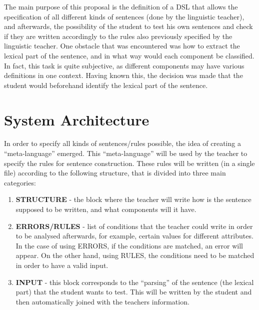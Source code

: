 The main purpose of this proposal is the definition of a \textsc{DSL} that allows the specification of all different kinds of sentences (done by the linguistic teacher), and afterwards, the possibility of the student to test his own sentences and check if they are written accordingly to the rules also previously specified by the linguistic teacher. One obstacle that was encountered was how to extract the lexical part of the sentence, and in what way would each component be classified. In fact, this task is quite subjective, as different components may have various definitions in one context. %
Having known this, the decision was made that the student would beforehand identify the lexical part of the sentence.


\section{System Architecture}
In order to specify all kinds of sentences/rules possible, the idea of creating a ``meta-language'' emerged. This ``meta-language'' will be used by the teacher to specify the rules for sentence construction. 
These rules will be written (in a single file) according to the following structure, that is divided into three main categories:

\begin{enumerate}
    \item \textbf{STRUCTURE} - the block where the teacher will write how is the sentence supposed to be written, and what components will it have.
    
    \item \textbf{ERRORS/RULES} - list of conditions that the teacher could write in order to be analysed afterwards, for example, certain values for different attributes. 
In the case of using ERRORS, if the conditions are matched, an error will appear. 
On the other hand, using RULES, the conditions need to be matched in order to have a valid input.
    
    \item \textbf{INPUT} - this block corresponds to the ``parsing'' of the sentence (the lexical part) that the student wants to test. This will be written by the student and then automatically joined with the teachers information.
\end{enumerate}

